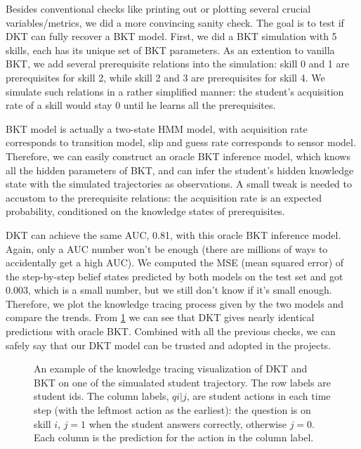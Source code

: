 Besides conventional checks like printing out or plotting several crucial variables/metrics, we did a more convincing sanity check. The goal is to test if DKT can fully recover a BKT model. First, we did a BKT simulation with 5 skills, each has its unique set of BKT parameters. As an extention to vanilla BKT, we add several prerequisite relations into the simulation: skill 0 and 1 are prerequisites for skill 2, while skill 2 and 3 are prerequisites for skill 4. We simulate such relations in a rather simplified manner: the student's acquisition rate of a skill would stay 0 until he learns all the prerequisites.

BKT model is actually a two-state HMM model, with acquisition rate corresponds to transition model, slip and guess rate corresponds to sensor model. Therefore, we can easily construct an oracle BKT inference model, which knows all the hidden parameters of BKT, and can infer the student's hidden knowledge state with the simulated trajectories as observations. A small tweak is needed to accustom to the prerequisite relations: the acquisition rate is an expected probability, conditioned on the knowledge states of prerequisites.

DKT can achieve the same AUC, 0.81, with this oracle BKT inference model. Again, only a AUC number won't be enough (there are millions of ways to accidentally get a high AUC). We computed the MSE (mean squared error) of the step-by-step belief states predicted by both models on the test set and got 0.003, which is a small number, but we still don't know if it's small enough. Therefore, we plot the knowledge tracing process given by the two models and compare the trends. From \ref{fig:match} we can see that DKT gives nearly identical predictions with oracle BKT. Combined with all the previous checks, we can safely say that our DKT model can be trusted and adopted in the projects.

\begin{figure}
\newline
{}
\caption{An example of the knowledge tracing visualization of DKT and BKT on one of the simualated student trajectory. The row labels are student ids. The column labels, $qi|j$, are student actions in each time step (with the leftmost action as the earliest): the question is on skill $i$, $j=1$ when the student answers correctly, otherwise $j=0$. Each column is the prediction for the action in the column label.}
\label{fig:match}
\end{figure}

